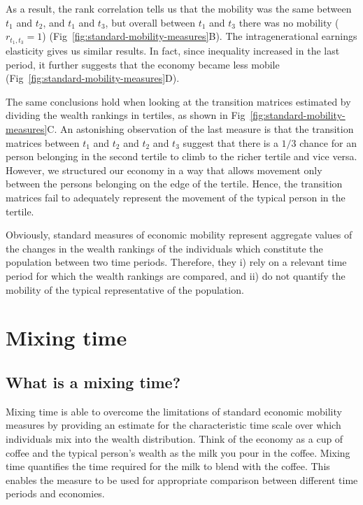 \documentclass[11pt]{article}
\numberwithin{equation}{section}
\begin{document}
As a result, the rank correlation tells us that the mobility was the same between $t_1$ and $t_2$, and $t_1$ and $t_3$, but overall between $t_1$ and $t_3$ there was no mobility ($r_{t_1,t_3} = 1$) (Fig~\ref{fig:standard-mobility-measures}B). The intragenerational earnings elasticity gives us similar results. In fact, since inequality increased in the last period, it further suggests that the economy became less mobile (Fig~\ref{fig:standard-mobility-measures}D). 

The same conclusions hold when looking at the transition matrices estimated by dividing the wealth rankings in tertiles, as shown in Fig~\ref{fig:standard-mobility-measures}C. An astonishing observation of the last measure is that the transition matrices between $t_1$ and $t_2$ and $t_2$ and $t_3$ suggest that there is a $1/3$ chance for an person belonging in the second tertile to climb to the richer tertile and vice versa. However, we structured our economy in a way that allows movement only between the persons belonging on the edge of the tertile. Hence, the transition matrices fail to adequately represent the movement of the typical person in the tertile.

Obviously, standard measures of economic mobility represent aggregate values of the changes in the wealth rankings of the individuals which constitute the population between two time periods. Therefore, they i) rely on a relevant time period for which the wealth rankings are compared, and ii) do not quantify the mobility of the typical representative of the population.

\section{Mixing time}

\subsection{What is a mixing time?}\label{sec:what}

Mixing time is able to overcome the limitations of standard economic mobility measures by providing an estimate for the characteristic time scale over which individuals mix into the wealth distribution. Think of the economy as a cup of coffee and the typical person's wealth as the milk you pour in the coffee. Mixing time quantifies the time required for the milk to blend with the coffee. This enables the measure to be used for appropriate comparison between different time periods and economies.
\end{document}
